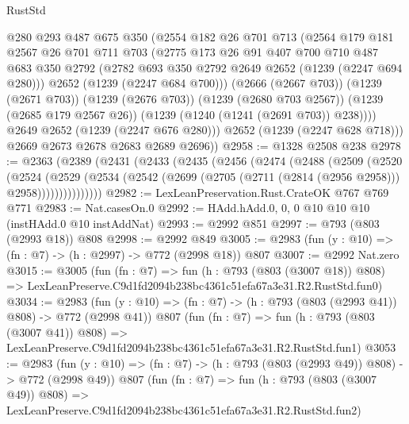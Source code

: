 \begin{lexlean}{RustStd}
\begin{coremodule}
            @280
            @293
            @487
            @675
            @350
            (@2554
              @182
              @26
              @701
              @713
              (@2564
                @179
                @181
                @2567
                @26
                @701
                @711
                @703
                (@2775
                  @173
                  @26
                  @91
                  @407
                  @700
                  @710
                  @487
                  @683
                  @350
                  @2792
                  (@2782 @693 @350 @2792 @2649 @2652 (@1239 (@2247 @694 @280)))
                  @2652
                  (@1239 (@2247 @684 @700)))
                (@2666 (@2667 @703))
                (@1239 (@2671 @703))
                (@1239 (@2676 @703))
                (@1239 (@2680 @703 @2567))
                (@1239 (@2685 @179 @2567 @26))
                (@1239 (@1240 (@1241 (@2691 @703)) @238))))
            @2649
            @2652
            (@1239 (@2247 @676 @280)))
          @2652
          (@1239 (@2247 @628 @718)))
        @2669
        @2673
        @2678
        @2683
        @2689
        @2696))
@2958 := @1328 @2508 @238
@2978 := @2363
    (@2389
      (@2431
        (@2433
          (@2435
            (@2456
              (@2474
                (@2488
                  (@2509
                    (@2520
                      (@2524
                        (@2529
                          (@2534
                            (@2542 (@2699 (@2705 (@2711 (@2814 (@2956 @2958))) @2958)))))))))))))))
@2982 := LexLeanPreservation.Rust.CrateOK @767 @769 @771
@2983 := Nat.casesOn.{0}
@2992 := HAdd.hAdd.{0, 0, 0} @10 @10 @10 (instHAdd.{0} @10 instAddNat)
@2993 := @2992 @851
@2997 := @793 (@803 (@2993 @18)) @808
@2998 := @2992 @849
@3005 := @2983 (fun (y : @10) => (fn : @7) -> (h : @2997) -> @772 (@2998 @18)) @807
@3007 := @2992 Nat.zero
@3015 := @3005
    (fun (fn : @7) =>
    fun (h : @793 (@803 (@3007 @18)) @808) =>
    LexLeanPreserve.C9d1fd2094b238bc4361c51efa67a3e31.R2.RustStd.fun0)
@3034 := @2983
    (fun (y : @10) => (fn : @7) -> (h : @793 (@803 (@2993 @41)) @808) -> @772 (@2998 @41))
    @807
    (fun (fn : @7) =>
    fun (h : @793 (@803 (@3007 @41)) @808) =>
    LexLeanPreserve.C9d1fd2094b238bc4361c51efa67a3e31.R2.RustStd.fun1)
@3053 := @2983
    (fun (y : @10) => (fn : @7) -> (h : @793 (@803 (@2993 @49)) @808) -> @772 (@2998 @49))
    @807
    (fun (fn : @7) =>
    fun (h : @793 (@803 (@3007 @49)) @808) =>
    LexLeanPreserve.C9d1fd2094b238bc4361c51efa67a3e31.R2.RustStd.fun2)

\end{coremodule}
\end{lexlean}
